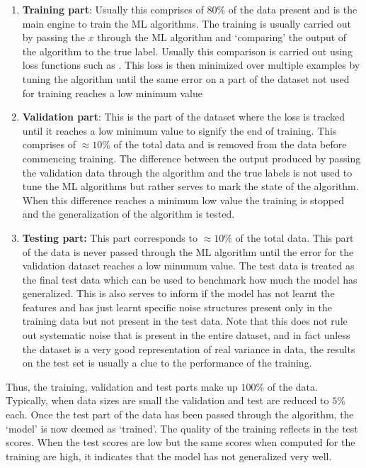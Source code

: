 \begin{enumerate}
    \item \textbf{Training part}: Usually this comprises of $80\%$ of the data present and is the main engine to train the ML algorithms.
    The training is usually carried out by passing the $x$ through the ML algorithm and `comparing' the output of the algorithm to the true label.
    Usually this comparison is carried out using loss functions such as \citep[cross entropy loss, ][]{1990ZhangCNN}.
    This loss is then minimized over multiple examples by tuning the algorithm until the same error on a part of the dataset not used for training reaches a low minimum value
    \item \textbf{Validation part}: This is the part of the dataset where the loss is tracked until it reaches a low minimum value to signify the end of training. 
    This comprises of $\approx 10\%$ of the total data and is removed from the data before commencing training. 
    The difference between the output produced by passing the validation data through the algorithm and the true labels is not used to tune the ML algorithms but rather serves to mark the state of the algorithm.
    When this difference reaches a minimum low value the training is stopped and the generalization of the algorithm is tested.
    \item \textbf{Testing part:} This part corresponds to $\approx 10\%$ of the total data.
    This part of the data is never passed through the ML algorithm until the error for the validation dataset reaches a low minumum value.
    The test data is treated as the final test data which can be used to benchmark how much the model has generalized. 
    This is also serves to inform if the model has not learnt the features and has just learnt specific noise structures present only in the training data but not present in the test data.
    Note that this does not rule out systematic noise that is present in the entire dataset, and in fact unless the dataset is a very good representation of real variance in data, the results on the test set is usually a clue to the performance of the training.
\end{enumerate}
Thus, the training, validation and test parts make up $100\%$ of the data. 
Typically, when data sizes are small the validation and test are reduced to $5\%$ each.
Once the test part of the data has been passed through the algorithm, the `model' is now deemed as `trained'. 
The quality of the training reflects in the test scores. 
When the test scores are low but the same scores when computed for the training are high, it indicates that the model has not generalized very well.
